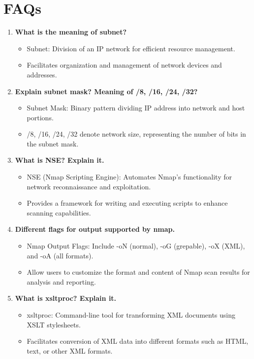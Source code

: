 \documentclass[11pt]{article}
\begin{document}
\section{FAQs}
\begin{enumerate}
    \item \textbf{What is the meaning of subnet?}
          \begin{itemize}
              \item Subnet: Division of an IP network for efficient resource management.
              \item Facilitates organization and management of network devices and addresses.
          \end{itemize}

    \item \textbf{Explain subnet mask? Meaning of /8, /16, /24, /32?}
          \begin{itemize}
              \item Subnet Mask: Binary pattern dividing IP address into network and host portions.
              \item /8, /16, /24, /32 denote network size, representing the number of bits in the subnet mask.
          \end{itemize}

    \item \textbf{What is NSE? Explain it.}
          \begin{itemize}
              \item NSE (Nmap Scripting Engine): Automates Nmap's functionality for network reconnaissance and exploitation.
              \item Provides a framework for writing and executing scripts to enhance scanning capabilities.
          \end{itemize}

    \item \textbf{Different flags for output supported by nmap.}
          \begin{itemize}
              \item Nmap Output Flags: Include -oN (normal), -oG (grepable), -oX (XML), and -oA (all formats).
              \item Allow users to customize the format and content of Nmap scan results for analysis and reporting.
          \end{itemize}

    \item \textbf{What is xsltproc? Explain it.}
          \begin{itemize}
              \item xsltproc: Command-line tool for transforming XML documents using XSLT stylesheets.
              \item Facilitates conversion of XML data into different formats such as HTML, text, or other XML formats.
          \end{itemize}


\end{enumerate}
\end{document}
